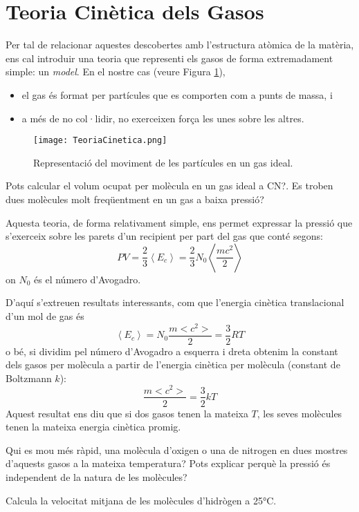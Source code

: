 \section{Teoria Cinètica dels Gasos}

Per tal de relacionar aquestes descobertes amb l'estructura atòmica de la matèria, ens cal introduir una teoria que representi els gasos de forma extremadament simple: un \textit{model}. En el nostre cas (veure Figura \ref{fig:TeoriaCinetica}),
\begin{itemize}
\item el gas és format per partícules que es comporten com a punts de massa, i
\item a més de no col·lidir, no exerceixen força les unes sobre les altres.
\end{itemize}
\begin{figure}[h]
\centering
\texttt{[image: TeoriaCinetica.png]}
\caption{Representació del moviment de les partícules en un gas ideal.}
\label{fig:TeoriaCinetica}
\end{figure}
\begin{exr}
Pots calcular el volum ocupat per molècula en un gas ideal a CN?. Es troben dues molècules molt freqüentment en un gas a baixa pressió?
\end{exr}
Aquesta teoria, de forma relativament simple, ens permet expressar la pressió que s'exerceix sobre les parets d'un recipient per part del gas que conté segons:
\[
PV=\frac{2}{3} \left< E_c \right> = \frac{2}{3} N_0 \left< \frac{mc^2}{2} \right>
\]
on $N_0$ és el número d'Avogadro.

D'aquí s'extreuen resultats interessants, com que l'energia cinètica translacional d'un mol de gas és 
\[\left<E_c\right>=N_0 \frac{m <c^2>}{2}=\frac{3}{2} RT\] 
o bé, si dividim pel número d'Avogadro a esquerra i dreta obtenim la constant dels gasos per molècula a partir de l'energia cinètica per molècula (constant de Boltzmann $k$): 
\[\frac{m <c^2>}{2}=\frac{3}{2} kT\]
Aquest resultat ens diu que si dos gasos tenen la mateixa $T$, les seves molècules tenen la mateixa energia cinètica promig. 

\begin{exr}
Qui es mou més ràpid, una molècula d'oxigen o una de nitrogen en dues mostres d'aquests gasos a la mateixa temperatura? Pots explicar perquè la pressió és independent de la natura de les molècules?
\end{exr}

\begin{exr}
Calcula la velocitat mitjana de les molècules d'hidrògen a 25\si\degreeCelsius.
\end{exr}

